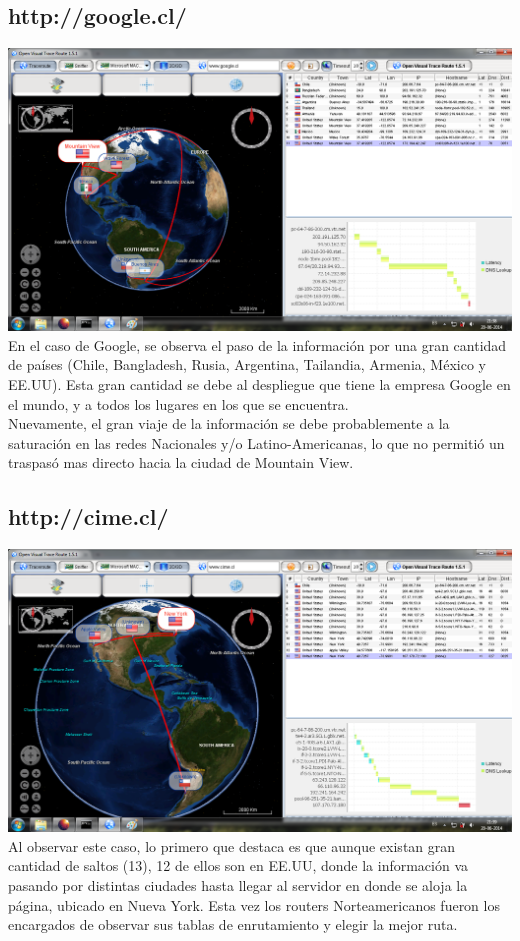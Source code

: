\documentclass{article}
\begin{document}
\subsection{http://google.cl/}
\includegraphics[scale=0.52]{Img/google.png} 
En el caso de Google, se observa el paso de la información por una gran cantidad de países (Chile, Bangladesh, Rusia, Argentina, Tailandia, Armenia, México y EE.UU). Esta gran cantidad se debe al despliegue que tiene la empresa Google en el mundo, y a todos los lugares en los que se encuentra.\\ Nuevamente, el gran viaje de la información se debe probablemente a la saturación en las redes Nacionales y/o Latino-Americanas, lo que no permitió un traspasó mas directo hacia la ciudad de Mountain View.


\subsection{http://cime.cl/}
\includegraphics[scale=0.52]{Img/cime.png} 
Al observar este caso, lo primero que destaca es que aunque existan gran cantidad de saltos (13), 12 de ellos son en EE.UU, donde la información va pasando por distintas ciudades hasta llegar al servidor en donde se aloja la página, ubicado en Nueva York. Esta vez los routers Norteamericanos fueron los encargados de observar sus tablas de enrutamiento y elegir la mejor ruta.
\end{document}
